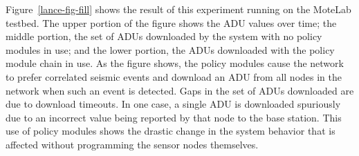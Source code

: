 Figure~\ref{lance-fig-fill} shows the result of this experiment running on
the MoteLab testbed. The upper portion of the figure shows the ADU values
over time; the middle portion, the set of ADUs downloaded by the system with
no policy modules in use; and the lower portion, the ADUs downloaded with the
policy module chain in use. As the figure shows, the policy modules cause the
network to prefer correlated seismic events and download an ADU from all
nodes in the network when such an event is detected. Gaps in the set of ADUs
downloaded are due to download timeouts. In one case, a single ADU is
downloaded spuriously due to an incorrect value being reported by that node
to the base station. This use of policy modules shows the drastic change in
the system behavior that is affected without programming the sensor nodes
themselves.
